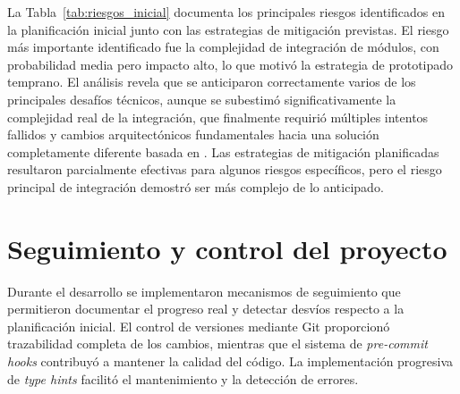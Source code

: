 \begin{table}[htbp!]
  \centering
  \caption{Análisis inicial de riesgos del proyecto}
  \label{tab:riesgos_inicial}
\end{table}

La Tabla~\ref{tab:riesgos_inicial} documenta los principales riesgos identificados en la planificación inicial junto con las estrategias de mitigación previstas. El riesgo más importante identificado fue la complejidad de integración de módulos, con probabilidad media pero impacto alto, lo que motivó la estrategia de prototipado temprano. El análisis revela que se anticiparon correctamente varios de los principales desafíos técnicos, aunque se subestimó significativamente la complejidad real de la integración, que finalmente requirió múltiples intentos fallidos y cambios arquitectónicos fundamentales hacia una solución completamente diferente basada en . Las estrategias de mitigación planificadas resultaron parcialmente efectivas para algunos riesgos específicos, pero el riesgo principal de integración demostró ser más complejo de lo anticipado.

\section{Seguimiento y control del proyecto}
\label{sec:seguimiento_control}

Durante el desarrollo se implementaron mecanismos de seguimiento que permitieron documentar el progreso real y detectar desvíos respecto a la planificación inicial. El control de versiones mediante Git proporcionó trazabilidad completa de los cambios, mientras que el sistema de \textit{\gls{pre-commit hooks}} contribuyó a mantener la calidad del código. La implementación progresiva de \textit{\gls{type hints}} facilitó el mantenimiento y la detección de errores.

